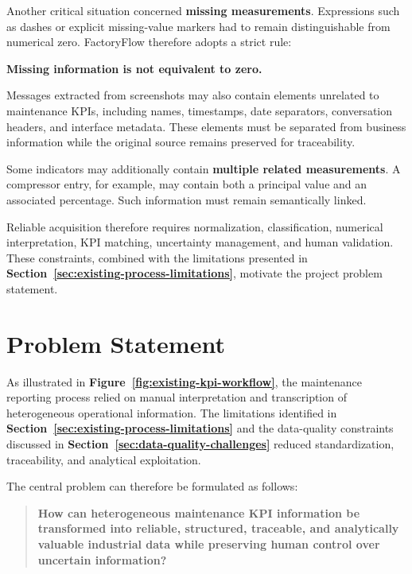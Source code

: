 Another critical situation concerned \textbf{missing measurements}. Expressions such as dashes or explicit missing-value markers had to remain distinguishable from numerical zero. FactoryFlow therefore adopts a strict rule:

\begin{center}
    \textbf{Missing information is not equivalent to zero.}
\end{center}

Messages extracted from screenshots may also contain elements unrelated to maintenance KPIs, including names, timestamps, date separators, conversation headers, and interface metadata. These elements must be separated from business information while the original source remains preserved for traceability.

Some indicators may additionally contain \textbf{multiple related measurements}. A compressor entry, for example, may contain both a principal value and an associated percentage. Such information must remain semantically linked.

Reliable acquisition therefore requires normalization, classification, numerical interpretation, KPI matching, uncertainty management, and human validation. These constraints, combined with the limitations presented in \textbf{Section~\ref{sec:existing-process-limitations}}, motivate the project problem statement.



\section{Problem Statement}
\label{sec:problem-statement}

As illustrated in \textbf{Figure~\ref{fig:existing-kpi-workflow}}, the maintenance reporting process relied on manual interpretation and transcription of heterogeneous operational information. The limitations identified in \textbf{Section~\ref{sec:existing-process-limitations}} and the data-quality constraints discussed in \textbf{Section~\ref{sec:data-quality-challenges}} reduced standardization, traceability, and analytical exploitation.

The central problem can therefore be formulated as follows:

\begin{quote}
\textbf{How can heterogeneous maintenance KPI information be transformed into reliable, structured, traceable, and analytically valuable industrial data while preserving human control over uncertain information?}
\end{quote}


